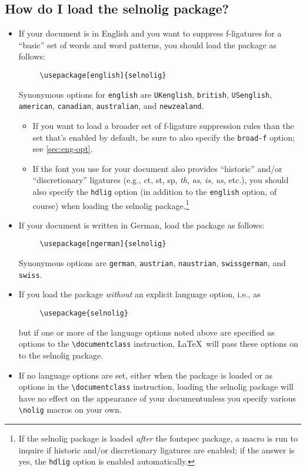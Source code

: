 \documentclass[12pt]{article}
\newcommand{\pkg}[1]{\textsf{#1}}
\newcommand{\opt}[1]{\texttt{#1}}
\newcommand{\cmmd}[1]{\texttt{\textbackslash #1}}
\begin{document}
\subsection[How do I load the selnolig package?]{How do I load the \pkg{selnolig} package?}

\begin{itemize}
\item If your document is in English and you want to suppress f-ligatures for a \enquote{basic} set of words and word patterns, you should load the package as follows:
\begin{Verbatim}
     \usepackage[english]{selnolig}
\end{Verbatim}
Synonymous options for \opt{english} are \opt{UKenglish}, \opt{british}, \opt{USenglish}, \opt{american}, \opt{cana\-dian}, \opt{australian}, and \opt{new\-zealand}.

\begin{itemize}
\item If you want to load a broader set of f-ligature suppression rules than the set that's enabled by default, be sure to also specify the \opt{broad-f} option; see  \cref{sec:eng-opt}.

\item If the font you use for your document also provides \enquote{historic} and/or \enquote{discretionary} ligatures (e.g., ct, st, sp, \emph{th}, \emph{as}, \emph{is}, \emph{us}, etc.), you should also specify the \opt{hdlig} option (in addition to the \opt{english} option, of course) when loading the \pkg{selnolig} package.\footnote{If the \pkg{selnolig} package is loaded \emph{after} the \pkg{fontspec} package, a macro is run to inquire if historic and/or discretionary ligatures are enabled; if the answer is yes, the \opt{hdlig} option is enabled automatically.}
\end{itemize}
\item If your document is written in German, load the package as follows:
\begin{Verbatim}
     \usepackage[ngerman]{selnolig}
\end{Verbatim}
Synonymous options are \opt{german}, \opt{austrian}, \opt{naustrian},  \opt{swissgerman}, and \opt{swiss}.

\item If you load the package \emph{without} an explicit language option, i.e., as
\begin{Verbatim}
     \usepackage{selnolig}
\end{Verbatim}
but if one or more of the language options noted above are specified as options to the \cmmd{documentclass} instruction, \LaTeX\ will pass these options on to the \pkg{selnolig} package.

\item If no language options are set, either when the package is loaded or as options in the \cmmd{documentclass} instruction, loading the \pkg{selnolig} package will have no effect on the appearance of your document\textemdash unless you specify various \cmmd{nolig} macros on your own.
\end{itemize}
\end{document}
